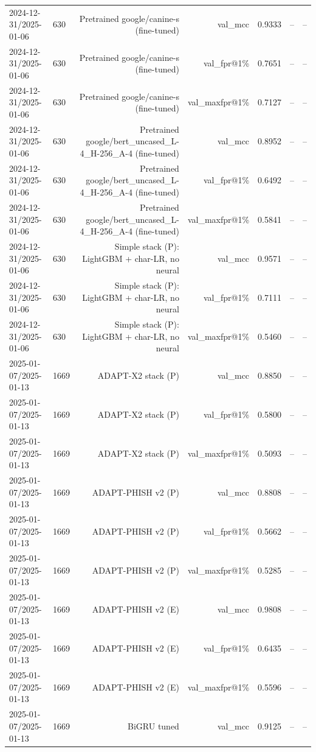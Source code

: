 \begin{table}[t]
\begin{tabular}{llrrrrr}
2024-12-31/2025-01-06 & 630 & Pretrained google/canine-s (fine-tuned) & val\_mcc & 0.9333 & -- & -- \\
2024-12-31/2025-01-06 & 630 & Pretrained google/canine-s (fine-tuned) & val\_fpr@1\% & 0.7651 & -- & -- \\
2024-12-31/2025-01-06 & 630 & Pretrained google/canine-s (fine-tuned) & val\_maxfpr@1\% & 0.7127 & -- & -- \\
2024-12-31/2025-01-06 & 630 & Pretrained google/bert\_uncased\_L-4\_H-256\_A-4 (fine-tuned) & val\_mcc & 0.8952 & -- & -- \\
2024-12-31/2025-01-06 & 630 & Pretrained google/bert\_uncased\_L-4\_H-256\_A-4 (fine-tuned) & val\_fpr@1\% & 0.6492 & -- & -- \\
2024-12-31/2025-01-06 & 630 & Pretrained google/bert\_uncased\_L-4\_H-256\_A-4 (fine-tuned) & val\_maxfpr@1\% & 0.5841 & -- & -- \\
2024-12-31/2025-01-06 & 630 & Simple stack (P): LightGBM + char-LR, no neural & val\_mcc & 0.9571 & -- & -- \\
2024-12-31/2025-01-06 & 630 & Simple stack (P): LightGBM + char-LR, no neural & val\_fpr@1\% & 0.7111 & -- & -- \\
2024-12-31/2025-01-06 & 630 & Simple stack (P): LightGBM + char-LR, no neural & val\_maxfpr@1\% & 0.5460 & -- & -- \\
2025-01-07/2025-01-13 & 1669 & ADAPT-X2 stack (P) & val\_mcc & 0.8850 & -- & -- \\
2025-01-07/2025-01-13 & 1669 & ADAPT-X2 stack (P) & val\_fpr@1\% & 0.5800 & -- & -- \\
2025-01-07/2025-01-13 & 1669 & ADAPT-X2 stack (P) & val\_maxfpr@1\% & 0.5093 & -- & -- \\
2025-01-07/2025-01-13 & 1669 & ADAPT-PHISH v2 (P) & val\_mcc & 0.8808 & -- & -- \\
2025-01-07/2025-01-13 & 1669 & ADAPT-PHISH v2 (P) & val\_fpr@1\% & 0.5662 & -- & -- \\
2025-01-07/2025-01-13 & 1669 & ADAPT-PHISH v2 (P) & val\_maxfpr@1\% & 0.5285 & -- & -- \\
2025-01-07/2025-01-13 & 1669 & ADAPT-PHISH v2 (E) & val\_mcc & 0.9808 & -- & -- \\
2025-01-07/2025-01-13 & 1669 & ADAPT-PHISH v2 (E) & val\_fpr@1\% & 0.6435 & -- & -- \\
2025-01-07/2025-01-13 & 1669 & ADAPT-PHISH v2 (E) & val\_maxfpr@1\% & 0.5596 & -- & -- \\
2025-01-07/2025-01-13 & 1669 & BiGRU tuned & val\_mcc & 0.9125 & -- & -- \\

\end{tabular}
\end{table}
